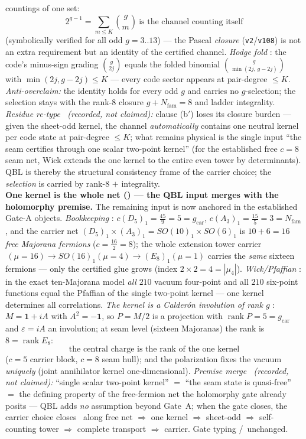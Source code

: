 \documentclass[11pt,a4paper]{article}
\newcommand{\Nfam}{N_{\mathrm{fam}}}
\theoremstyle{definition}
\begin{document}
\begin{keybox}
countings of one set:
\[
  \boxed{\ 2^{g-1}=\sum_{m\le K}\binom gm\ \text{is the channel counting itself}\ }
\]
(symbolically verified for all odd $g=3..13$) --- the Pascal \emph{closure} (\texttt{v2}/\texttt{v108}) is not an
extra requirement but an identity of the certified channel. \emph{Hodge fold} \mE: the code's
minus-sign grading $\binom g{2j}$ equals the folded binomial $\binom g{\min(2j,\,g-2j)}$ with
$\min(2j,g-2j)\le K$ --- every code sector appears at pair-degree $\le K$. \emph{Anti-overclaim:}
the identity holds for every odd $g$ and carries no $g$-selection; the selection stays with the
rank-$8$ closure $g+\Nfam=8$ and ladder integrality. \emph{Residue re-type \mC\ (recorded, not
claimed):} clause (b$'$) loses its closure burden --- given the sheet-odd kernel, the channel
\emph{automatically} contains one neutral kernel per code state at pair-degree $\le K$; what remains
physical is the single input ``the seam certifies through one scalar two-point kernel'' (for the
established free $c=8$ seam net, Wick extends the one kernel to the entire even tower by
determinants). QBL is thereby the structural consistency frame of the carrier choice; the
\emph{selection} is carried by rank-$8$ $+$ integrality.
\smallskip\\
\noindent\textbf{One kernel is the whole net () --- the QBL input
merges with the holomorphy premise.} The remaining input is now anchored in the established Gate-A
objects. \emph{Bookkeeping} \mE: $c(D_5)_1=\tfrac{45}9=5=g_{\mathrm{car}}$, $c(A_3)_1=\tfrac{15}5=3=\Nfam$,
and the carrier net $(D_5)_1\times(A_3)_1=SO(10)_1\times SO(6)_1$ is $10+6=16$ \emph{free Majorana
fermions} ($c=\tfrac{16}2=8$); the whole extension tower carrier$\,(\mu{=}16)\to SO(16)_1(\mu{=}4)\to
(E_8)_1(\mu{=}1)$ carries the \emph{same} sixteen fermions --- only the certified glue grows (index
$2\times2=4=|\mu_4|$). \emph{Wick/Pfaffian} \mE: in the exact ten-Majorana model \emph{all} $210$
vacuum four-point and all $210$ six-point functions equal the Pfaffian of the single two-point kernel
--- one kernel determines all correlations. \emph{The kernel is a Calder\'on involution of rank $g$}
\mE: $M=\mathbf1+iA$ with $A^2=-\mathbf1$, so $P=M/2$ is a projection with $\operatorname{rank}P=5=
g_{\mathrm{car}}$ and $\varepsilon=iA$ an involution; at seam level (sixteen Majoranas) the rank is
$8=\operatorname{rank}E_8$:
\[
  \boxed{\ \text{the central charge is the rank of the one kernel}\ }
\]
($c=5$ carrier block, $c=8$ seam hull); and the polarization fixes the vacuum \emph{uniquely} (joint
annihilator kernel one-dimensional). \emph{Premise merge \mC\ (recorded, not claimed):} ``single
scalar two-point kernel'' $=$ ``the seam state is quasi-free'' $=$ the defining property of the
free-fermion net the holomorphy gate already posits --- QBL adds \emph{no} assumption beyond Gate~A;
when the gate closes, the carrier choice closes \mE\ along free net $\Rightarrow$ one kernel
$\Rightarrow$ sheet-odd $\Rightarrow$ self-counting tower $\Rightarrow$ complete transport
$\Rightarrow$ carrier. Gate typing \mC/\mO\ unchanged.
\end{keybox}
\end{document}
